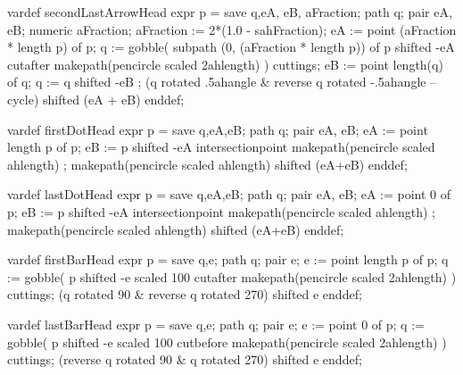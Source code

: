   vardef secondLastArrowHead expr p =
    save q,eA, eB, aFraction; path q; pair eA, eB; numeric aFraction;
    aFraction := 2*(1.0 - sahFraction);
    eA := point (aFraction * length p) of p;
    q := gobble(
      subpath (0, (aFraction * length p)) of p shifted -eA
      cutafter makepath(pencircle scaled 2ahlength)
    ) cuttings;
    eB := point length(q) of q;
    q := q shifted -eB ;
    (q rotated .5ahangle & reverse q rotated -.5ahangle -- cycle)
      shifted (eA + eB)
  enddef;

  vardef firstDotHead expr p =
    save q,eA,eB; path q; pair eA, eB;
    eA := point length p of p;
    eB := p shifted -eA intersectionpoint makepath(pencircle scaled ahlength) ;
    makepath(pencircle scaled ahlength) shifted (eA+eB)
  enddef;
  
  vardef lastDotHead expr p =
    save q,eA,eB; path q; pair eA, eB;
    eA := point 0 of p;
    eB := p shifted -eA intersectionpoint makepath(pencircle scaled ahlength) ;
    makepath(pencircle scaled ahlength) shifted (eA+eB)
  enddef;

  vardef firstBarHead expr p =
    save q,e; path q; pair e;
    e := point length p of p;
    q := gobble(
      p shifted -e scaled 100
      cutafter makepath(pencircle scaled 2ahlength)
    ) cuttings;
    (q rotated 90 & reverse q rotated 270) shifted e
  enddef;

  vardef lastBarHead expr p =
    save q,e; path q; pair e;
    e := point 0 of p;
    q := gobble(
      p shifted -e scaled 100
      cutbefore makepath(pencircle scaled 2ahlength)
    ) cuttings;
    (reverse q rotated 90 & q rotated 270) shifted e
  enddef;
  
